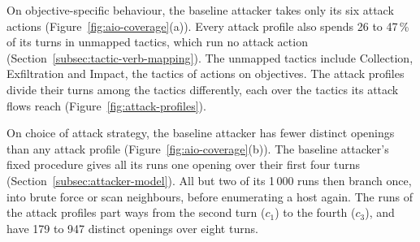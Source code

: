 \documentclass{cshonours}
\newcommand{\prelim}[1]{#1}
\begin{document}
On objective-specific behaviour, the baseline attacker takes only its six
attack actions (Figure~\ref{fig:aio-coverage}(a)). Every attack profile also
spends \prelim{26} to \prelim{47}\,\% of its turns in unmapped tactics, which
run no attack action (Section~\ref{subsec:tactic-verb-mapping}). The
unmapped tactics include Collection, Exfiltration and Impact, the tactics of
actions on objectives. The attack profiles divide their
turns among the tactics differently, each over the tactics its attack flows
reach (Figure~\ref{fig:attack-profiles}).

On choice of attack strategy, the baseline attacker has fewer distinct
openings than any attack profile (Figure~\ref{fig:aio-coverage}(b)). The
baseline attacker's fixed procedure gives all its runs one opening over their first \prelim{four}
turns (Section~\ref{subsec:attacker-model}).
All but \prelim{two} of its 1\,000 runs then branch once, into brute force or
scan neighbours, before enumerating a host again. The runs of the attack
profiles part ways from the \prelim{second} turn ($c_1$) to the
\prelim{fourth} ($c_3$), and have \prelim{179} to \prelim{947} distinct
openings over eight turns.
\end{document}

